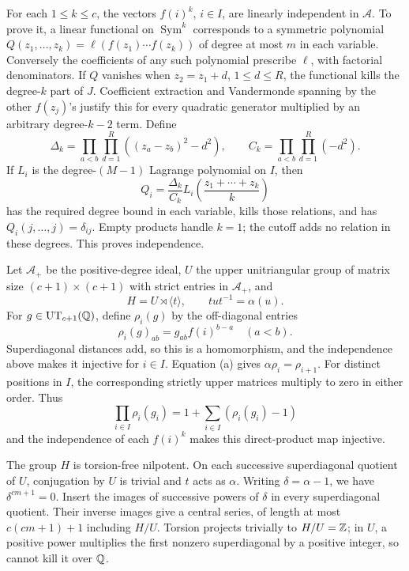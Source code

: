 For each \(1\le k\le c\), the vectors \(f(i)^k\), \(i\in I\), are
linearly independent in \(\mathcal A\).
To prove it, a linear functional on \(\operatorname{Sym}^k\)
corresponds to a symmetric polynomial
\(Q(z_1,\ldots,z_k)=\ell(f(z_1)\cdots f(z_k))\) of degree at most
\(m\) in each variable. Conversely the coefficients of any such
polynomial prescribe \(\ell\), with factorial denominators.
If \(Q\) vanishes when \(z_2=z_1+d\), \(1\le d\le R\), the functional
kills the degree-\(k\) part of \(J\). Coefficient extraction and
Vandermonde spanning by the other \(f(z_j)\)'s justify this for every
quadratic generator multiplied by an arbitrary degree-\(k-2\) term.
Define
\[
 \Delta_k=\prod_{a<b}\prod_{d=1}^R((z_a-z_b)^2-d^2),\qquad
 C_k=\prod_{a<b}\prod_{d=1}^R(-d^2).
\]
If \(L_i\) is the degree-\((M-1)\) Lagrange polynomial on \(I\), then
\[
 Q_i=\frac{\Delta_k}{C_k}
 L_i\left(\frac{z_1+\cdots+z_k}{k}\right)
\]
has the required degree bound in each variable, kills those relations,
and has \(Q_i(j,\ldots,j)=\delta_{ij}\).
Empty products handle \(k=1\); the cutoff adds no relation in these
degrees. This proves independence.

Let \(\mathcal A_+\) be the positive-degree ideal, \(U\) the
upper unitriangular group of matrix size \((c+1)\times(c+1)\) with strict
entries in \(\mathcal A_+\), and
\[
 H=U\rtimes\langle t\rangle,\qquad tut^{-1}=\alpha(u).
\]
For \(g\in\mathrm{UT}_{c+1}(\mathbb Q)\), define \(\rho_i(g)\) by the
off-diagonal entries
\[
 \rho_i(g)_{ab}=g_{ab}f(i)^{b-a}\quad(a<b).
\]
Superdiagonal distances add, so this is a homomorphism, and the
independence above makes it injective for \(i\in I\).
Equation (a) gives \(\alpha\rho_i=\rho_{i+1}\).
For distinct positions in \(I\), the corresponding strictly upper
matrices multiply to zero in either order. Thus
\[
 \prod_{i\in I}\rho_i(g_i)=1+\sum_{i\in I}(\rho_i(g_i)-1)
\]
and the independence of each \(f(i)^k\) makes this direct-product map
injective.

The group \(H\) is torsion-free nilpotent.
On each successive superdiagonal quotient of \(U\), conjugation by
\(U\) is trivial and \(t\) acts as \(\alpha\).
Writing \(\delta=\alpha-1\), we have \(\delta^{cm+1}=0\).
Insert the images of successive powers of \(\delta\) in every
superdiagonal quotient. Their inverse images give a central series,
of length at most \(c(cm+1)+1\) including \(H/U\).
Torsion projects trivially to \(H/U=\mathbb Z\); in \(U\), a positive
power multiplies the first nonzero superdiagonal by a positive integer,
so cannot kill it over \(\mathbb Q\).

